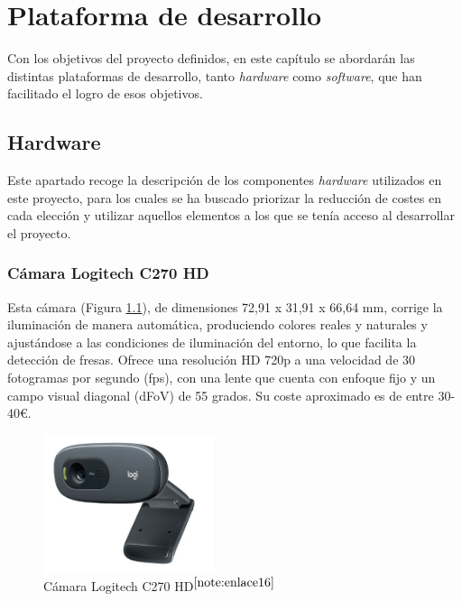 \chapter{Plataforma de desarrollo}
\label{cap:capitulo4}
 
Con los objetivos del proyecto definidos, en este capítulo se abordarán las distintas plataformas de desarrollo, tanto \textit{hardware} como \textit{software}, que han facilitado el logro de esos objetivos.

\section{Hardware}
\label{sec:hardware}

Este apartado recoge la descripción de los componentes \textit{hardware} utilizados en este proyecto, para los cuales se ha buscado priorizar la reducción de costes en cada elección y utilizar aquellos elementos a los que se tenía acceso al desarrollar el proyecto.

\subsection{Cámara Logitech C270 HD}
\label{subsec:logiC270HD}

Esta cámara (Figura \ref{fig:logiC270HD}), de dimensiones 72,91 x 31,91 x 66,64 mm, corrige la iluminación de manera automática, produciendo colores reales y naturales y ajustándose a las condiciones de iluminación del entorno, lo que facilita la detección de fresas. Ofrece una resolución HD 720p %
a una velocidad de 30 fotogramas por segundo (fps), con una lente que cuenta con enfoque fijo y un campo visual diagonal (dFoV) de 55 grados. Su coste aproximado es de entre 30-40€.

\begin{figure} [H]
    \begin{center}
      \includegraphics[width=5cm]{figs/logi C270.png}
    \end{center}
    \caption{Cámara Logitech C270 HD$^{\ref{note:enlace16}}$}
    \label{fig:logiC270HD}
\end{figure}

